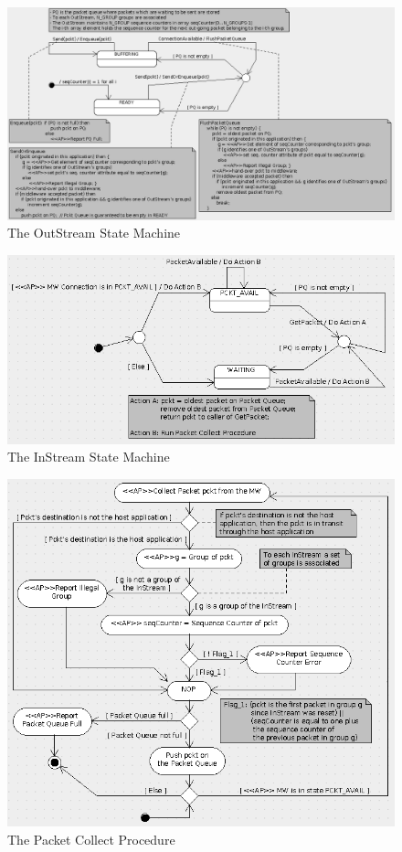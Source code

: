 \documentclass[a4paper,10pt]{article}
\begin{document}
\begin{figure}[h]
 \centering
 \includegraphics[scale=0.35,keepaspectratio=true]{OutStream.png}
 \caption{The OutStream State Machine}
 \label{fig:OutStream}
\end{figure}

\begin{figure}[h]
 \centering
 \includegraphics[scale=0.35,keepaspectratio=true]{InStream.png}
 \caption{The InStream State Machine}
 \label{fig:InStream}
\end{figure}

\begin{figure}[h]
 \centering
 \includegraphics[scale=0.35,keepaspectratio=true]{PacketCollect.png}
 \caption{The Packet Collect Procedure}
 \label{fig:PacketCollect}
\end{figure}
\end{document}
